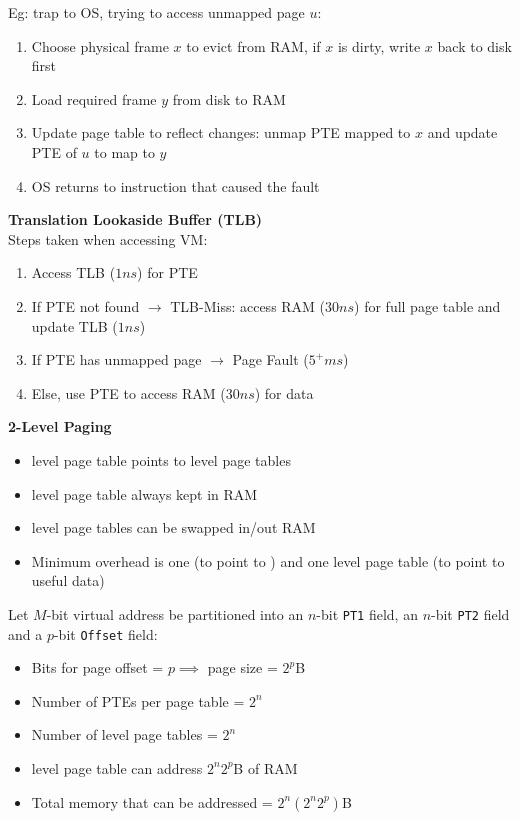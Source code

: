 \documentclass[a4paper, 12pt]{article}
\begin{document}
\begin{multicols*}{4}
Eg: trap to OS, trying to access unmapped page $u$:
\begin{enumerate}
	\item Choose physical frame $x$ to evict from RAM, if $x$ is dirty, write $x$ back to disk first
	\item Load required frame $y$ from disk to RAM
	\item Update page table to reflect changes: unmap PTE mapped to $x$ and update PTE of $u$ to map to $y$
	\item OS returns to instruction that caused the fault
\end{enumerate}
\textbf{Translation Lookaside Buffer (TLB)} \\
Steps taken when accessing VM:
\begin{enumerate}
	\item Access TLB ($1ns$) for PTE
	\item If PTE not found $\rightarrow$ TLB-Miss: access RAM ($30ns$) for full page table and update TLB ($1ns$)
	\item If PTE has unmapped page $\rightarrow$ Page Fault ($5^+ms$)
	\item Else, use PTE to access RAM ($30ns$) for data
\end{enumerate}
\textbf{2-Level Paging}
\begin{itemize}
	\item {} level page table points to  level page tables
	\item {} level page table always kept in RAM
	\item {} level page tables can be swapped in/out RAM
	\item Minimum overhead is one  (to point to ) and one  level page table (to point to useful data)
\end{itemize}
Let $M$-bit virtual address be partitioned into an $n$-bit \texttt{PT1} field, an $n$-bit \texttt{PT2} field and a $p$-bit \texttt{Offset} field:
\begin{itemize} 
	\item Bits for page offset = $p \implies$ page size = $2^p$B
	\item Number of PTEs per page table = $2^n$
	\item Number of  level page tables = $2^n$
	\item {} level page table can address $2^n2^p$B of RAM
	\item Total memory that can be addressed = $2^n(2^n2^p)$B
\end{itemize}

\end{multicols*}
\end{document}
